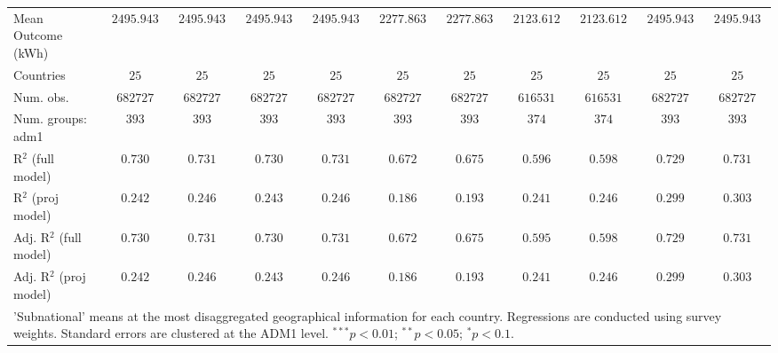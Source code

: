 \begin{table}[H]
\begin{center}
\begin{tabular}{l c c c c c c c c c c}
Mean Outcome (kWh)              & $2495.943$    & $2495.943$    & $2495.943$    & $2495.943$     & $2277.863$    & $2277.863$     & $2123.612$    & $2123.612$     & $2495.943$    & $2495.943$     \\
Countries                       & $25$          & $25$          & $25$          & $25$           & $25$          & $25$           & $25$          & $25$           & $25$          & $25$           \\
Num. obs.                       & $682727$      & $682727$      & $682727$      & $682727$       & $682727$      & $682727$       & $616531$      & $616531$       & $682727$      & $682727$       \\
Num. groups: adm1               & $393$         & $393$         & $393$         & $393$          & $393$         & $393$          & $374$         & $374$          & $393$         & $393$          \\
R$^2$ (full model)              & $0.730$       & $0.731$       & $0.730$       & $0.731$        & $0.672$       & $0.675$        & $0.596$       & $0.598$        & $0.729$       & $0.731$        \\
R$^2$ (proj model)              & $0.242$       & $0.246$       & $0.243$       & $0.246$        & $0.186$       & $0.193$        & $0.241$       & $0.246$        & $0.299$       & $0.303$        \\
Adj. R$^2$ (full model)         & $0.730$       & $0.731$       & $0.730$       & $0.731$        & $0.672$       & $0.675$        & $0.595$       & $0.598$        & $0.729$       & $0.731$        \\
Adj. R$^2$ (proj model)         & $0.242$       & $0.246$       & $0.243$       & $0.246$        & $0.186$       & $0.193$        & $0.241$       & $0.246$        & $0.299$       & $0.303$        \\
\hline
\multicolumn{11}{l}{\scriptsize{'Subnational' means at the most disaggregated geographical information for each country. Regressions are conducted using survey weights.
       Standard errors are clustered at the ADM1 level. $^{***}p<0.01$; $^{**}p<0.05$; $^{*}p<0.1$.}}
\end{tabular}
\label{main: tableA3}
\end{center}
\end{table}

